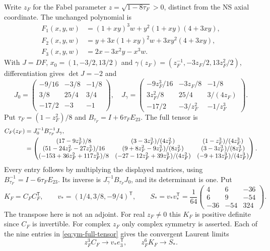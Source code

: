 Write $z_F$ for the Fabel parameter
$z=\sqrt{1-8\tau_F}>0$, distinct from the NS axial coordinate.
The unchanged polynomial is
\begin{align*}
 F_1(x,y,w)&=(1+xy)^3w+y^2(1+xy)(4+3xy),\\
 F_2(x,y,w)&=y+3x(1+xy)^2w+3xy^2(4+3xy),\\
 F_3(x,y,w)&=2x-3x^2y-x^3w .
\end{align*}
With $J=DF$, $x_0=(1,-3/2,13/2)$ and
$\gamma(z_F)=(z_F^{-1},-3z_F/2,13z_F^2/2)$, differentiation gives
$\det J=-2$ and
\[
 J_0=\begin{pmatrix}-9/16&-3/8&-1/8\\3/8&25/4&3/4\\-17/2&-3&-1\end{pmatrix},
 \quad J_\gamma=\begin{pmatrix}
 -9z_F^3/16&-3z_F/8&-1/8\\3z_F^2/8&25/4&3/(4z_F)\\
 -17/2&-3/z_F^2&-1/z_F^3
 \end{pmatrix}.
\]
Put $\tau_F=(1-z_F^2)/8$ and $B_{\tau_F}=I+6\tau_FE_{23}$.
The full tensor is
\begin{align}
 C_F(z_F)&=J_0^{-1}B_{\tau_F}^{-1}J_\gamma,\notag\\
 &=\begin{pmatrix}
 (17-9z_F^3)/8&(3-3z_F^3)/(4z_F^2)&(1-z_F^3)/(4z_F^3)\\
 (51-24z_F^2-27z_F^3)/16&(9+8z_F^2-9z_F^3)/(8z_F^2)&(3-3z_F^3)/(8z_F^3)\\
 (-153+36z_F^2+117z_F^3)/8&(-27-12z_F^2+39z_F^3)/(4z_F^2)&(-9+13z_F^3)/(4z_F^3)
 \end{pmatrix}.\label{eq:ym-full-tensor}
\end{align}
Every entry follows by multiplying the displayed matrices, using
$B_{\tau_F}^{-1}=I-6\tau_FE_{23}$. Its inverse is
$J_\gamma^{-1}B_{\tau_F}J_0$, and its determinant is one.
Put
\[
 K_F=C_FC_F^{\mathsf T},\qquad
 v_*=(1/4,3/8,-9/4)^{\mathsf T},\qquad
 S_*=v_*v_*^{\mathsf T}
 =\frac1{64}\begin{pmatrix}4&6&-36\\6&9&-54\\-36&-54&324\end{pmatrix}.
\]
The transpose here is not an adjoint. For real $z_F\ne0$ this
$K_F$ is positive definite since $C_F$ is invertible. For complex
$z_F$ only complex symmetry is asserted. Each of the nine entries
in \eqref{eq:ym-full-tensor} gives the convergent Laurent limits
\begin{equation}\label{eq:ym-full-endpoint}
 z_F^3C_F\longrightarrow v_*e_3^{\mathsf T},\qquad
 z_F^6K_F\longrightarrow S_* .
\end{equation}


